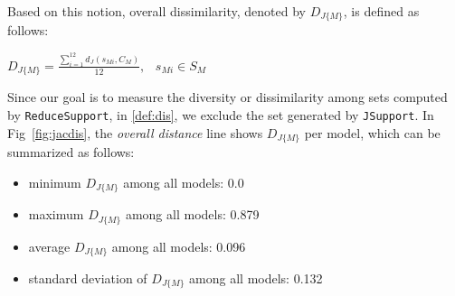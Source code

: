 Based on this notion, overall dissimilarity, denoted by $D_{J\{M\}}$, is defined as follows:

\begin{definition}
  \label{def:dis}
  $D_{J\{M\}} =  \frac{\sum_{i=1}^{12}d_J(s_{Mi}, C_M)}{12},   \hspace{9pt} s_{Mi} \in S_M$
\end{definition}

Since our goal is to measure the diversity or dissimilarity among sets computed by \texttt{ReduceSupport}, in \ref{def:dis}, we exclude the set generated by \texttt{JSupport}. In Fig~\ref{fig:jacdis}, the \emph{overall distance} line shows $D_{J\{M\}}$ per model, which can be summarized as follows:
\begin{itemize}
  \item minimum $D_{J\{M\}}$ among all models: 0.0
  \item maximum $D_{J\{M\}}$ among all models: 0.879
  \item average $D_{J\{M\}}$ among all models: 0.096
  \item standard deviation of $D_{J\{M\}}$ among all models: 0.132
\end{itemize}

\vspace{6pt}
\noindent{}
 \vspace{6pt}

